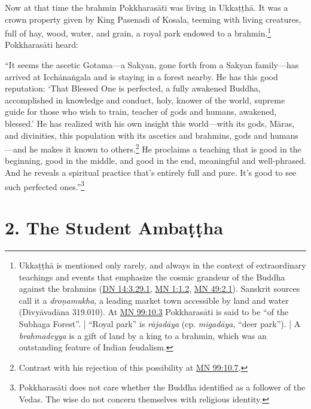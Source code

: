 \documentclass[12pt,openany]{book}%
\begin{document}
Now at that time the brahmin \textsanskrit{Pokkharasāti} was living in \textsanskrit{Ukkaṭṭhā}. It was a crown property given by King Pasenadi of Kosala, teeming with living creatures, full of hay, wood, water, and grain, a royal park endowed to a brahmin.\footnote{\textsanskrit{Ukkaṭṭhā} is mentioned only rarely, and always in the context of extraordinary teachings and events that emphasize the cosmic grandeur of the Buddha against the brahmins (\href{https://suttacentral.net/dn14/en/sujato\#3.29.1}{DN 14:3.29.1}, \href{https://suttacentral.net/mn1/en/sujato\#1.2}{MN 1:1.2}, \href{https://suttacentral.net/mn49/en/sujato\#2.1}{MN 49:2.1}). Sanskrit sources call it a \textit{\textsanskrit{droṇamukha}}, a leading market town accessible by land and water (\textsanskrit{Divyāvadāna} 319.010). At \href{https://suttacentral.net/mn99/en/sujato\#10.3}{MN 99:10.3} \textsanskrit{Pokkharasāti} is said to be “of the Subhaga Forest”. | “Royal park” is \textit{\textsanskrit{rājadāya}} (cp. \textit{\textsanskrit{migadāya}}, “deer park”). | A \textit{brahmadeyya} is a gift of land by a king to a brahmin, which was an outstanding feature of Indian feudalism. } \textsanskrit{Pokkharasāti} heard: 

“It seems the ascetic Gotama—a Sakyan, gone forth from a Sakyan family—has arrived at \textsanskrit{Icchānaṅgala} and is staying in a forest nearby. He has this good reputation: ‘That Blessed One is perfected, a fully awakened Buddha, accomplished in knowledge and conduct, holy, knower of the world, supreme guide for those who wish to train, teacher of gods and humans, awakened, blessed.’ He has realized with his own insight this world—with its gods, \textsanskrit{Māras}, and divinities, this population with its ascetics and brahmins, gods and humans—and he makes it known to others.\footnote{Contrast with his rejection of this possibility at \href{https://suttacentral.net/mn99/en/sujato\#10.7}{MN 99:10.7}. } He proclaims a teaching that is good in the beginning, good in the middle, and good in the end, meaningful and well-phrased. And he reveals a spiritual practice that’s entirely full and pure. It’s good to see such perfected ones.”\footnote{\textsanskrit{Pokkharasāti} does not care whether the Buddha identified as a follower of the Vedas. The wise do not concern themselves with religious identity. } 

\section*{2. The Student \textsanskrit{Ambaṭṭha} }
\end{document}
